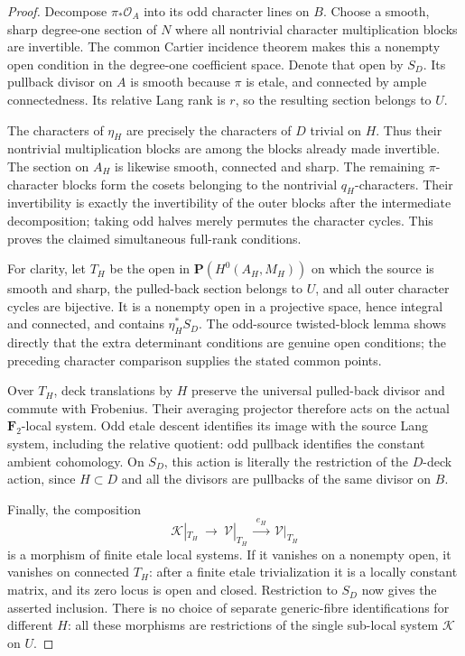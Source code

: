 \begin{proof}
Decompose \(\pi_*\mathcal O_A\) into its odd character lines
on \(B\). Choose a smooth, sharp degree-one section of \(N\)
where all nontrivial character multiplication blocks are invertible.
The common Cartier incidence theorem makes this a nonempty open
condition in the degree-one coefficient space. Denote that open by
\(S_D\). Its pullback divisor on \(A\) is smooth because
\(\pi\) is etale, and connected by ample connectedness.
Its relative Lang rank is \(r\), so the resulting section belongs
to \(U\).

The characters of \(\eta_H\) are precisely the characters of
\(D\) trivial on \(H\). Thus their nontrivial multiplication
blocks are among the blocks already made invertible. The section on
\(A_H\) is likewise smooth, connected and sharp. The remaining
\(\pi\)-character blocks form the cosets belonging to the
nontrivial \(q_H\)-characters. Their invertibility is exactly
the invertibility of the outer blocks after the intermediate
decomposition; taking odd halves merely permutes the character
cycles. This proves the claimed simultaneous full-rank conditions.

For clarity, let \(T_H\) be the open in
\(\mathbf P(H^0(A_H,M_H))\) on which the source is smooth and
sharp, the pulled-back section belongs to \(U\), and all outer
character cycles are bijective. It is a nonempty open in a
projective space, hence integral and connected, and contains
\(\eta_H^*S_D\). The odd-source twisted-block lemma shows
directly that the extra determinant conditions are genuine open
conditions; the preceding character comparison supplies the stated
common points.

Over \(T_H\), deck translations by \(H\) preserve the
universal pulled-back divisor and commute with Frobenius. Their
averaging projector therefore acts on the actual
\(\mathbf F_2\)-local system. Odd etale descent identifies its
image with the source Lang system, including the relative quotient:
odd pullback identifies the constant ambient cohomology. On
\(S_D\), this action is literally the restriction of the
\(D\)-deck action, since \(H\subset D\) and all the divisors
are pullbacks of the same divisor on \(B\).

Finally, the composition
\[
 \mathcal K|_{T_H}\ \longrightarrow\
 \mathcal V|_{T_H}\ \xrightarrow{\ e_H\ }\
 \mathcal V|_{T_H}
 \tag{CCI5}
\]
is a morphism of finite etale local systems. If it vanishes on a
nonempty open, it vanishes on connected \(T_H\): after a finite
etale trivialization it is a locally constant matrix, and its
zero locus is open and closed. Restriction to \(S_D\) now gives
the asserted inclusion. There is no choice of separate generic-fibre
identifications for different \(H\): all these morphisms are
restrictions of the single sub-local system \(\mathcal K\)
on \(U\).
\end{proof}

